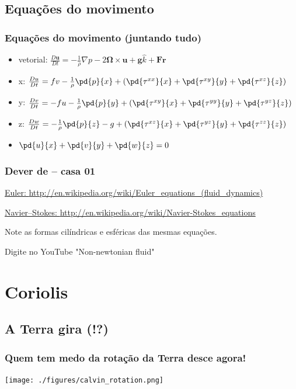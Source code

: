 \subsection{Equações do movimento}
\begin{frame}
\frametitle{Equações do movimento (juntando tudo)}
  \begin{itemize}[<+-| alert@+>]
    \item vetorial: $\frac{D{\mathbf{u}}}{Dt} = -\frac{1}{\rho}\nabla{p} -2\mathbf{\Omega} \times \mathbf{u} + \mathbf{g}\hat{k} + \mathbf{Fr}$
    \item x: $\frac{Du}{Dt} = fv - \frac{1}{\rho}\pd{p}{x} + \left(\pd{\tau^{xx}}{x} + \pd{\tau^{xy}}{y} + \pd{\tau^{xz}}{z}\right)$
    \item y: $\frac{Dv}{Dt} = -fu - \frac{1}{\rho}\pd{p}{y} + \left(\pd{\tau^{xy}}{x} + \pd{\tau^{yy}}{y} + \pd{\tau^{yz}}{z}\right)$
    \item z: $\frac{Dw}{Dt} = - \frac{1}{\rho}\pd{p}{z} - g + \left(\pd{\tau^{xz}}{x} + \pd{\tau^{yz}}{y} + \pd{\tau^{zz}}{z}\right)$
    \item $\pd{u}{x} + \pd{v}{y} + \pd{w}{z} = 0$
  \end{itemize}
\end{frame}


\begin{frame}
\frametitle{Dever de -- casa 01}
    \begin{block}{}
      \href{http://en.wikipedia.org/wiki/Euler_equations_(fluid_dynamics)}{Euler: \url{http://en.wikipedia.org/wiki/Euler_equations_(fluid_dynamics)}}
    \end{block}

    \begin{block}{}
      \href{http://en.wikipedia.org/wiki/Navier-Stokes_equations}{Navier–Stokes: \url{http://en.wikipedia.org/wiki/Navier-Stokes_equations}}
    \end{block}
    {\scriptsize Note as formas cilíndricas e esféricas das mesmas equações.}

    {\scriptsize * Digite no YouTube "Non-newtonian fluid"}
\end{frame}

\section{Coriolis}
\subsection{A Terra gira (!?)}
\begin{frame}
  \frametitle{Quem tem medo da rotação da Terra desce agora!}
  \begin{center}
    \texttt{[image: ./figures/calvin\_rotation.png]}
  \end{center}
\end{frame}


